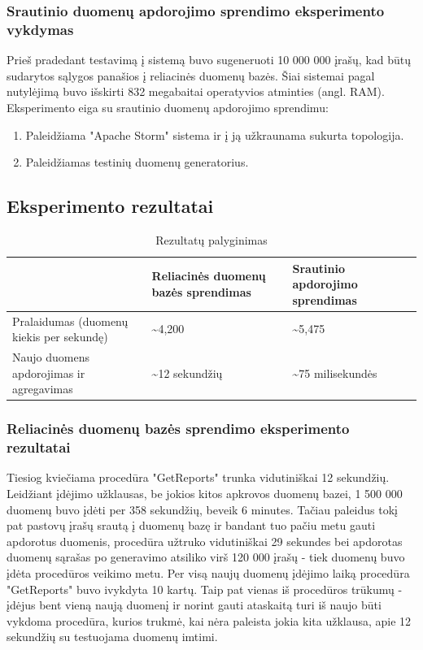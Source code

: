 \documentclass{VUMIFPSkursinis}
\begin{document}
\subsubsection{Srautinio duomenų apdorojimo sprendimo eksperimento vykdymas}

Prieš pradedant testavimą į sistemą buvo sugeneruoti 10 000 000 įrašų, kad būtų sudarytos sąlygos panašios į reliacinės duomenų bazės.
Šiai sistemai pagal nutylėjimą buvo išskirti 832 megabaitai operatyvios atminties (angl. RAM). 
Eksperimento eiga su srautinio duomenų apdorojimo sprendimu:
\begin{enumerate} 
\item Paleidžiama "Apache Storm" sistema ir į ją užkraunama sukurta topologija.
\item Paleidžiamas testinių duomenų generatorius.
\end{enumerate}
\newpage
\subsection{Eksperimento rezultatai}
\begin{table}[!htbp]
    \begin{center}
        \caption{Rezultatų palyginimas}
        \label{table:results}
        \begin{tabular}{ | l | p{4cm} | p{3cm} | } 
            \hline
              & Reliacinės duomenų bazės sprendimas & Srautinio apdorojimo sprendimas \\* \hline
            Pralaidumas (duomenų kiekis per sekundę) & \textasciitilde4,200 & \textasciitilde5,475 \\* \hline
            Naujo duomens apdorojimas ir agregavimas  & \textasciitilde12 sekundžių & \textasciitilde75 milisekundės\\* \hline
        \end{tabular}
    \end{center}
\end{table}\par
\subsubsection{Reliacinės duomenų bazės sprendimo eksperimento rezultatai}
Tiesiog kviečiama procedūra "GetReports" trunka vidutiniškai 12 sekundžių. Leidžiant įdėjimo užklausas, be jokios kitos apkrovos duomenų bazei, 1 500 000 duomenų
buvo įdėti per 358 sekundžių, beveik 6 minutes. Tačiau paleidus tokį pat pastovų įrašų srautą į duomenų bazę ir bandant tuo pačiu metu gauti apdorotus duomenis,
procedūra užtruko vidutiniškai 29 sekundes bei apdorotas duomenų sąrašas po generavimo atsiliko virš 120 000 įrašų - tiek duomenų buvo įdėta procedūros veikimo metu. 
Per visą naujų duomenų įdėjimo laiką procedūra "GetReports" buvo ivykdyta 10 kartų.
Taip pat vienas iš procedūros trūkumų - įdėjus bent vieną naują duomenį ir norint gauti ataskaitą turi iš naujo būti vykdoma procedūra, kurios trukmė, kai nėra 
paleista jokia kita užklausa, apie 12 sekundžių su testuojama duomenų imtimi.
\end{document}
